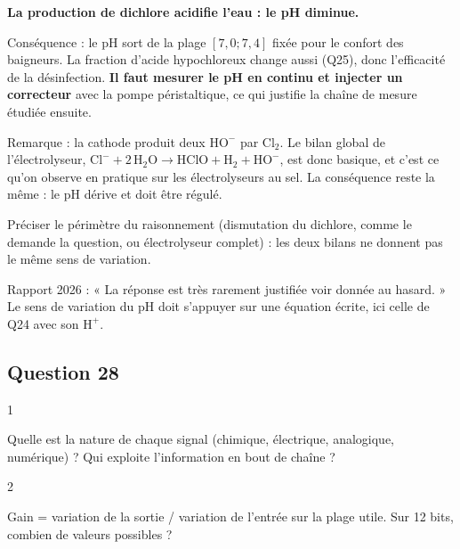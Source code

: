 \documentclass[11pt,a4paper]{article}
\begin{document}
\textbf{La production de dichlore acidifie l'eau : le pH diminue.}

Conséquence : le pH sort de la plage \([7{,}0;7{,}4]\) fixée pour le confort des baigneurs. La fraction d'acide hypochloreux change aussi (Q25), donc l'efficacité de la désinfection. \textbf{Il faut mesurer le pH en continu et injecter un correcteur} avec la pompe péristaltique, ce qui justifie la chaîne de mesure étudiée ensuite.

Remarque : la cathode produit deux \(\mathrm{HO^-}\) par \(\mathrm{Cl_2}\). Le bilan global de l'électrolyseur, \(\mathrm{Cl^-}+2\,\mathrm{H_2O}\to\mathrm{HClO}+\mathrm{H_2}+\mathrm{HO^-}\), est donc basique, et c'est ce qu'on observe en pratique sur les électrolyseurs au sel. La conséquence reste la même : le pH dérive et doit être régulé.

\begin{piege}

Préciser le périmètre du raisonnement (dismutation du dichlore, comme le demande la question, ou électrolyseur complet) : les deux bilans ne donnent pas le même sens de variation.

\end{piege}

\begin{jury}

Rapport 2026 : « La réponse est très rarement justifiée voir donnée au hasard. » Le sens de variation du pH doit s'appuyer sur une équation écrite, ici celle de Q24 avec son \(\mathrm{H^+}\).

\end{jury}

\hypertarget{question-28}{%
\subsection{Question 28}\label{question-28}}

\begin{indication}{1}

Quelle est la nature de chaque signal (chimique, électrique, analogique, numérique) ? Qui exploite l'information en bout de chaîne ?

\end{indication}

\begin{indication}{2}

Gain = variation de la sortie / variation de l'entrée sur la plage utile. Sur 12 bits, combien de valeurs possibles ?

\end{indication}
\end{document}

